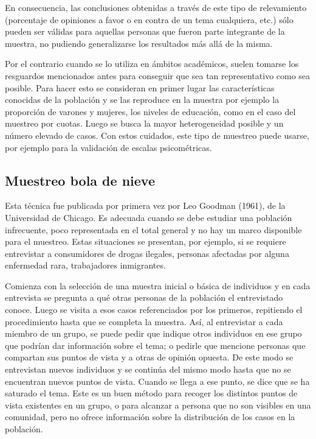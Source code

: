 \documentclass[]{book}
\begin{document}
En consecuencia, las conclusiones obtenidas a través de este tipo de
relevamiento (porcentaje de opiniones a favor o en contra de un tema
cualquiera, etc.) sólo pueden ser válidas para aquellas personas que
fueron parte integrante de la muestra, no pudiendo generalizarse los
resultados más allá de la misma.

Por el contrario cuando se lo utiliza en ámbitos académicos, suelen
tomarse los resguardos mencionados antes para conseguir que sea tan
representativo como sea posible. Para hacer esto se consideran en primer
lugar las características conocidas de la población y se las reproduce
en la muestra por ejemplo la proporción de varones y mujeres, los
niveles de educación, como en el caso del muestreo por cuotas. Luego se
busca la mayor heterogeneidad posible y un número elevado de casos. Con
estos cuidados, este tipo de muestreo puede usarse, por ejemplo para la
validación de escalas psicométricas.

\hypertarget{muestreo-bola-de-nieve}{%
\subsection{Muestreo bola de nieve}\label{muestreo-bola-de-nieve}}

Esta técnica fue publicada por primera vez por Leo Goodman (1961), de la
Universidad de Chicago. Es adecuada cuando se debe estudiar una
población infrecuente, poco representada en el total general y no hay un
marco disponible para el muestreo. Estas situaciones se presentan, por
ejemplo, si se requiere entrevistar a consumidores de drogas ilegales,
personas afectadas por alguna enfermedad rara, trabajadores inmigrantes.

Comienza con la selección de una muestra inicial o básica de individuos
y en cada entrevista se pregunta a qué otras personas de la población el
entrevistado conoce. Luego se visita a esos casos referenciados por los
primeros, repitiendo el procedimiento hasta que se completa la muestra.
Así, al entrevistar a cada miembro de un grupo, se puede pedir que
indique otros individuos en ese grupo que podrían dar información sobre
el tema; o pedirle que mencione personas que compartan sus puntos de
vista y a otras de opinión opuesta. De este modo se entrevistan nuevos
individuos y se continúa del mismo modo hasta que no se encuentran
nuevos puntos de vista. Cuando se llega a ese punto, se dice que se ha
saturado el tema. Este es un buen método para recoger los distintos
puntos de vista existentes en un grupo, o para alcanzar a persona que no
son visibles en una comunidad, pero no ofrece información sobre la
distribución de los casos en la población.
\end{document}
